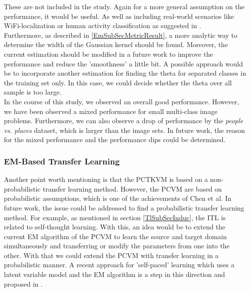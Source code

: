 These are not included in the study. Again for a more general assumption on the performance, it would be useful.
As well as including real-world scenarios like WiFi-localization or human activity classification as suggested in \cite[p. 32]{Weiss.2016}.\\
Furthermore, as described in \ref{EmSubSecMetricResult}, a more analytic way to determine the width of the Gaussian kernel should be found. Moreover, the current estimation should be modified in a future work to improve the performance and reduce the 'smoothness' a little bit.
A possible approach would be to incorporate another estimation for finding the theta for separated classes in the training set only. In this case, we could decide whether the theta over all sample is too large.\\
In the course of this study, we observed an overall good performance. However, we have been observed a mixed performance for  small multi-class image problems. Furthermore, we can also observe a drop of performance by the \textit{people vs. places} dataset, which is larger than the image sets.
In future work, the reason for the mixed performance and the performance dips could be determined.\\
\subsubsection{EM-Based Transfer Learning}
Another point worth mentioning is that the \acs{PCTKVM} is based on a non-probabilistic transfer learning method. 
However, the \acs{PCVM} are based on probabilistic assumptions, which is one of the achievements of Chen et al.
In future work, the issue could be addressed to find a probabilistic transfer learning method.
For example, as mentioned in section \ref{TlSubSecInduc}, the \acl{ITL} is related to self-thought learning.
With this, an idea would be to extend the current \acs{EM} algorithm of the \acs{PCVM} to learn the source and target domain simultaneously and transferring or modify the parameters from one into the other.
With that we could extend the \acs{PCVM} with transfer learning in a probabilistic manner.
A recent approach for 'self-paced' learning which uses a latent variable model and the \acs{EM} algorithm is a step in this direction and proposed in \cite{Kumar.2010}.
